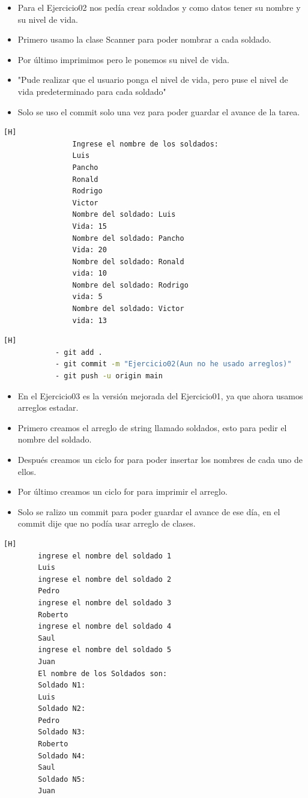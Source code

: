 \documentclass{article}
\begin{document}
	
		\begin{itemize}
			\item Para el Ejercicio02 nos pedía crear soldados y como datos tener su nombre y su nivel de vida.
			\item Primero usamo la clase Scanner para poder nombrar a cada soldado.
			\item Por último imprimimos pero le ponemos su nivel de vida.
			\item "Pude realizar que el usuario ponga el nivel de vida, pero puse el nivel de vida predeterminado para cada soldado"
			\item Solo se uso el commit solo una vez para poder guardar el avance de la tarea.
		\end{itemize}
		\begin{lstlisting}[language=bash,caption={Ejecución del Ejercicio02}][H]
				Ingrese el nombre de los soldados: 
				Luis
				Pancho
				Ronald
				Rodrigo
				Victor
				Nombre del soldado: Luis
				Vida: 15
				Nombre del soldado: Pancho
				Vida: 20
				Nombre del soldado: Ronald
				vida: 10
				Nombre del soldado: Rodrigo
				vida: 5
				Nombre del soldado: Victor
				vida: 13
		\end{lstlisting}
		\begin{lstlisting}[language=bash,caption={Commit: Ejercicio02(Aun no he usado arreglos)}][H]
			- git add .
			- git commit -m "Ejercicio02(Aun no he usado arreglos)"			
			- git push -u origin main
		\end{lstlisting}
		
	\begin{itemize}
		\item En el Ejercicio03 es la versión mejorada del Ejercicio01, ya que ahora usamos arreglos estadar.
		\item Primero creamos el arreglo de string llamado soldados, esto para pedir el nombre del soldado.
		\item Después creamos un ciclo for para poder insertar los nombres de cada uno de ellos.
		\item Por último creamos un ciclo for para imprimir el arreglo.
		\item Solo se ralizo un commit para poder guardar el avance de ese día, en el commit dije que no podía usar arreglo de clases.
	\end{itemize}
	\begin{lstlisting}[language=bash,caption={Ejecución del Ejercicio03}][H]
		ingrese el nombre del soldado 1
		Luis
		ingrese el nombre del soldado 2
		Pedro
		ingrese el nombre del soldado 3
		Roberto
		ingrese el nombre del soldado 4
		Saul
		ingrese el nombre del soldado 5
		Juan
		El nombre de los Soldados son: 
		Soldado N1:
		Luis
		Soldado N2:
		Pedro
		Soldado N3:
		Roberto
		Soldado N4:
		Saul
		Soldado N5:
		Juan
\end{lstlisting}
\end{document}
